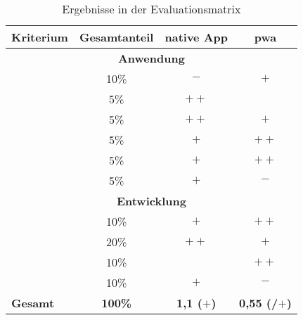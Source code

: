  \newpage

\begin{table}[t!]
	\centering
	\begin{tabular}{|l|c|c|c|}
		\hline
		\textbf{Kriterium}              & \textbf{Gesamtanteil} & \cellcolor{blue!25} \textbf{native App} & \cellcolor{green!25}\textbf{\ac{pwa}} \\
		
		\hline
		\multicolumn{4}{c}{\textbf{Anwendung}}         \\
		\hline
		\nameref{sec:6-plattform}   & 10\%         &\cellcolor{blue!25}$-$& \cellcolor{green!25}$+$ \\
		\nameref{sec:6-installation}           & 5\%           & \cellcolor{blue!25}$++$ & \cellcolor{green!25}\Circle \\
		\nameref{sec:6-speicherzugriff}        & 5\%          &\cellcolor{blue!25}$++$& \cellcolor{green!25}$+$ \\
		\nameref{sec:6-speicherbedarf}         & 5\%          &\cellcolor{blue!25}$+$&\cellcolor{green!25}$++$\\
		\nameref{sec:6-aktualisierbarkeit}     & 5\%          &\cellcolor{blue!25}$+$&\cellcolor{green!25}$++$ \\
		\nameref{sec:6-konsistenz-des-designs} & 5\%         &\cellcolor{blue!25}$+$& \cellcolor{green!25}$-$\\
		
		\hline
		\multicolumn{4}{c}{\textbf{Entwicklung}}      \\
		\hline
		\nameref{sec:6-bibliotheken}           & 10\%         &\cellcolor{blue!25}$+$&\cellcolor{green!25}$++$ \\
		\nameref{sec:6-umsetzung}              & 20\%         &\cellcolor{blue!25}$++$&\cellcolor{green!25}$+$ \\
		\nameref{sec:6-testbarkeit}            & 10\%         &\cellcolor{blue!25}\Circle &\cellcolor{green!25}$++$\\
		\nameref{sec:6-vorausgesetzte-entwicklungserfahrung}    & 10\%  &\cellcolor{blue!25}$+$&\cellcolor{green!25}$-$ \\
		\hline
		\hline
		\textbf{Gesamt}                  & \textbf{100\%}        &\cellcolor{blue!25}\textbf{1,1 ($+$)}& \cellcolor{green!25}\textbf{0,55 (\Circle/$+$)} \\
		\hline
	\end{tabular}
	\caption{Ergebnisse in der Evaluationsmatrix} \label{tab:evaluationsmatrix_ausgefüllt}
\end{table}



